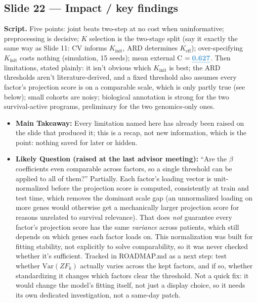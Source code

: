 \documentclass[11pt]{article}
\newcommand{\scriptlabel}{\textbf{Script. }}
\newcommand{\sectionlabel}[1]{\textbf{#1}}
\newcommand{\num}[1]{\textcolor{keycar}{\textbf{\uline{#1}}}} %
\begin{document}
\subsection*{Slide 22 --- Impact / key findings}
\scriptlabel Five points: joint beats two-step at no cost when uninformative; preprocessing is
decisive; $K$ selection is the two-stage split (say it exactly the same way as Slide 11: CV informs
$K_\text{init}$, ARD determines $K_\text{eff}$); over-specifying $K_\text{init}$ costs nothing
(simulation, 15 seeds); mean external C $=\num{0.627}$. Then limitations, stated plainly: it isn't
obvious which $K_\text{init}$ is best; the ARD thresholds aren't literature-derived, and a fixed
threshold also assumes every factor's projection score is on a comparable scale, which is only
partly true (see below); small cohorts are noisy; biological annotation is strong for the two
survival-active programs, preliminary for the two genomics-only ones.

\begin{itemize}
\item \sectionlabel{Main Takeaway:} Every limitation named here has already been raised on the slide
that produced it; this is a recap, not new information, which is the point: nothing saved for later
or hidden.
\item \sectionlabel{Likely Question (raised at the last advisor meeting):} ``Are the $\beta$
coefficients even comparable across factors, so a single threshold can be applied to all of them?''
Partially. Each factor's loading vector is unit-normalized before the projection score is computed,
consistently at train and test time, which removes the dominant scale gap (an unnormalized loading
on more genes would otherwise get a mechanically larger projection score for reasons unrelated to
survival relevance). That does \emph{not} guarantee every factor's projection score has the same
\emph{variance} across patients, which still depends on which genes each factor loads on. This
normalization was built for fitting stability, not explicitly to solve comparability, so it was
never checked whether it's sufficient. Tracked in ROADMAP.md as a next step: test whether
$\text{Var}(ZF_k)$ actually varies across the kept factors, and if so, whether standardizing it
changes which factors clear the threshold. Not a quick fix: it would change the model's fitting
itself, not just a display choice, so it needs its own dedicated investigation, not a same-day patch.
\end{itemize}
\end{document}
